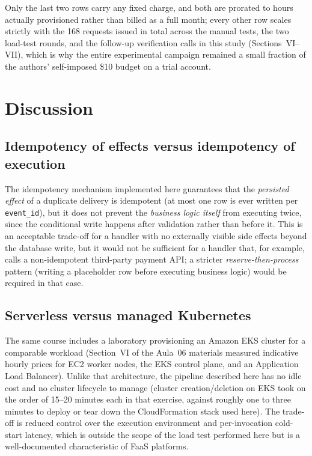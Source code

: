 \documentclass[conference]{IEEEtran}
\begin{document}
Only the last two rows carry any fixed charge, and both are prorated to hours actually provisioned rather than billed as a full month; every other row scales strictly with the 168 requests issued in total across the manual tests, the two load-test rounds, and the follow-up verification calls in this study (Sections~VI--VII), which is why the entire experimental campaign remained a small fraction of the authors' self-imposed \$10 budget on a trial account.

\section{Discussion}

\subsection{Idempotency of effects versus idempotency of execution}
The idempotency mechanism implemented here guarantees that the \emph{persisted effect} of a duplicate delivery is idempotent (at most one row is ever written per \texttt{event\_id}), but it does not prevent the \emph{business logic itself} from executing twice, since the conditional write happens after validation rather than before it. This is an acceptable trade-off for a handler with no externally visible side effects beyond the database write, but it would not be sufficient for a handler that, for example, calls a non-idempotent third-party payment API; a stricter \emph{reserve-then-process} pattern (writing a placeholder row before executing business logic) would be required in that case.

\subsection{Serverless versus managed Kubernetes}
The same course includes a laboratory provisioning an Amazon EKS cluster for a comparable workload (Section~VI of the Aula~06 materials measured indicative hourly prices for EC2 worker nodes, the EKS control plane, and an Application Load Balancer). Unlike that architecture, the pipeline described here has no idle cost and no cluster lifecycle to manage (cluster creation/deletion on EKS took on the order of 15--20 minutes each in that exercise, against roughly one to three minutes to deploy or tear down the CloudFormation stack used here). The trade-off is reduced control over the execution environment and per-invocation cold-start latency, which is outside the scope of the load test performed here but is a well-documented characteristic of FaaS platforms.
\end{document}
